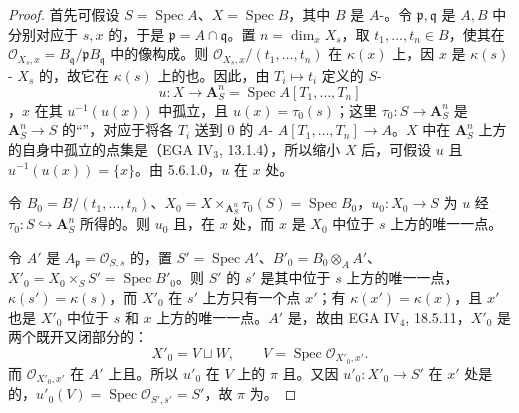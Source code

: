\begin{proof}
首先可假设 $S=\operatorname{Spec}A$、$X=\operatorname{Spec}B$，其中 $B$ 是 $A$-。令 $\mathfrak p,\mathfrak q$ 是 $A,B$ 中分别对应于 $s,x$ 的，于是 $\mathfrak p=A\cap\mathfrak q$。置 $n=\dim_xX_s$，取 $t_1,\ldots,t_n\in B$，使其在 $\mathcal O_{X_s,x}=B_{\mathfrak q}/\mathfrak pB_{\mathfrak q}$ 中的像构成。则 $\mathcal O_{X_s,x}/(t_1,\ldots,t_n)$ 在 $\kappa(x)$ 上，因 $x$ 是 $\kappa(s)$- $X_s$ 的，故它在 $\kappa(s)$ 上的也。因此，由 $T_i\mapsto t_i$ 定义的 $S$-
\[
u:X\longrightarrow\mathbf A_S^n=\operatorname{Spec}A[T_1,\ldots,T_n]
\]
，$x$ 在其 $u^{-1}(u(x))$ 中孤立，且 $u(x)=\tau_0(s)$；这里 $\tau_0:S\to\mathbf A_S^n$ 是 $\mathbf A_S^n\to S$ 的“”，对应于将各 $T_i$ 送到 $0$ 的 $A$- $A[T_1,\ldots,T_n]\to A$。$X$ 中在 $\mathbf A_S^n$ 上方的自身中孤立的点集是（EGA IV$_3$, 13.1.4），所以缩小 $X$ 后，可假设 $u$ 且 $u^{-1}(u(x))=\{x\}$。由 5.6.1.0，$u$ 在 $x$ 处。

令 $B_0=B/(t_1,\ldots,t_n)$、$X_0=X\times_{\mathbf A_S^n}\tau_0(S)=\operatorname{Spec}B_0$，$u_0:X_0\to S$ 为 $u$ 经 $\tau_0:S\hookrightarrow\mathbf A_S^n$ 所得的。则 $u_0$ 且，在 $x$ 处，而 $x$ 是 $X_0$ 中位于 $s$ 上方的唯一一点。

令 $A'$ 是 $A_{\mathfrak p}=\mathcal O_{S,s}$ 的，置 $S'=\operatorname{Spec}A'$、$B'_0=B_0\otimes_AA'$、$X'_0=X_0\times_SS'=\operatorname{Spec}B'_0$。则 $S'$ 的 $s'$ 是其中位于 $s$ 上方的唯一一点，$\kappa(s')=\kappa(s)$，而 $X'_0$ 在 $s'$ 上方只有一个点 $x'$；有 $\kappa(x')=\kappa(x)$，且 $x'$ 也是 $X'_0$ 中位于 $s$ 和 $x$ 上方的唯一一点。$A'$ 是，故由 EGA IV$_4$, 18.5.11，$X'_0$ 是两个既开又闭部分的：
\[
X'_0=V\sqcup W,\qquad V=\operatorname{Spec}\mathcal O_{X'_0,x'}.
\tag{$*$}
\]
而 $\mathcal O_{X'_0,x'}$ 在 $A'$ 上且。所以 $u'_0$ 在 $V$ 上的 $\pi$ 且。又因 $u'_0:X'_0\to S'$ 在 $x'$ 处是的，$u'_0(V)=\operatorname{Spec}\mathcal O_{S',s'}=S'$，故 $\pi$ 为。


\end{proof}
